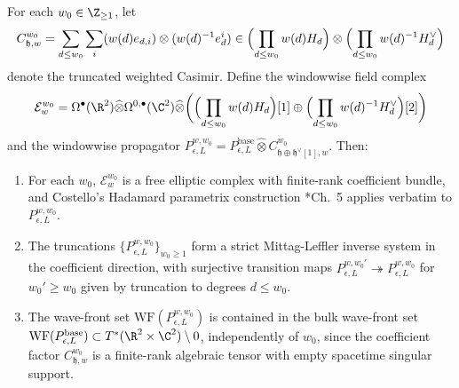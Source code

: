\begin{lem}\label{lem:windowwise-parametrix}
  For each $w_0\in\Z_{\geq1}$, let
  \[
    C_{\mathfrak h,w}^{w_0}
      =
    \sum_{d\leq w_0}\sum_i
      (w(d)e_{d,i})\otimes(w(d)^{-1}e^i_d)
      \in
    \Bigl(\prod_{d\leq w_0}w(d)H_d\Bigr)
      \otimes
    \Bigl(\prod_{d\leq w_0}w(d)^{-1}H_d^\vee\Bigr)
  \]
  denote the truncated weighted Casimir. Define the windowwise field complex
  \begin{equation}\label{eq:windowwise-field-complex}
    \mathcal E_w^{w_0}=\Omega^\bullet(\R^2)\widehat\otimes
      \Omega^{0,\bullet}(\C^2)\widehat\otimes
      \biggl(\Bigl(\prod_{d\leq w_0}w(d)H_d\Bigr)[1]
      \oplus\Bigl(\prod_{d\leq w_0}w(d)^{-1}H_d^\vee\Bigr)[2]\biggr)
  \end{equation}
  and the windowwise propagator
  $P_{\epsilon,L}^{w,w_0}=P_{\epsilon,L}^{\mathrm{base}}\widehat\otimes
  C_{\mathfrak h\oplus\mathfrak h^\vee[1],w}^{w_0}$. Then:
  \begin{enumerate}[label=(\arabic*)]
    \item For each $w_0$, $\mathcal E_w^{w_0}$ is a free elliptic
      complex with finite-rank coefficient bundle, and Costello's
      Hadamard parametrix construction
      \cite{costello-renormalization}*{Ch.~5} applies verbatim to
      $P_{\epsilon,L}^{w,w_0}$.
    \item The truncations $\{P_{\epsilon,L}^{w,w_0}\}_{w_0\geq1}$
      form a strict Mittag-Leffler inverse system in the coefficient
      direction, with surjective transition maps
      $P_{\epsilon,L}^{w,w_0'}\twoheadrightarrow P_{\epsilon,L}^{w,w_0}$
      for $w_0'\geq w_0$ given by truncation to degrees
      $d\leq w_0$.
    \item The wave-front set
      $\mathrm{WF}(P_{\epsilon,L}^{w,w_0})$ is contained in the
      bulk wave-front set $\mathrm{WF}(P_{\epsilon,L}^{\mathrm{base}})
      \subset T^*(\R^2\times\C^2)\setminus 0$, independently of
      $w_0$, since the coefficient factor
      $C_{\mathfrak h,w}^{w_0}$ is a finite-rank algebraic tensor
      with empty spacetime singular support.
  \end{enumerate}
\end{lem}

